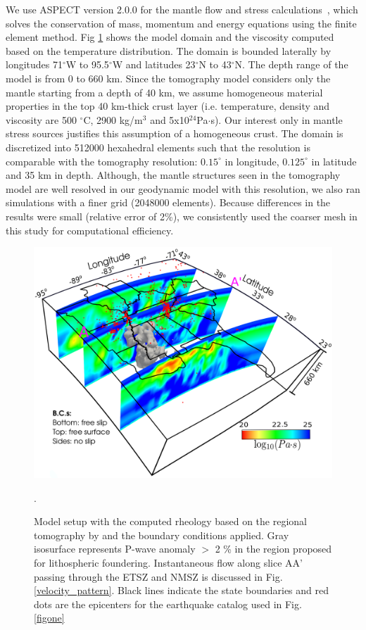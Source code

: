 \documentclass[draft,linenumbers]{agujournal2018}
\begin{document}
    We use ASPECT version 2.0.0 for the mantle flow and stress calculations~\citep{heister_aspect_methods2,KHB12,aspect-doi-v2.0.0}, which solves the conservation of mass, momentum and energy equations using the finite element method. Fig \ref{fig_model} shows the model domain and the viscosity computed based on the temperature distribution. The domain is bounded laterally by longitudes 71$^\circ$W to 95.5$^\circ$W and latitudes 23$^\circ$N to 43$^\circ$N. The depth range of the model is from 0 to 660 km. Since the tomography model considers only the mantle starting from a depth of 40 km, we assume homogeneous material properties in the top 40 km-thick crust layer (i.e. temperature, density and viscosity are 500 $^{\circ}$C, 2900 kg/m$^{3}$ and  5x10$^{24}$Pa$\cdot$s). Our interest only in mantle stress sources justifies this assumption of a homogeneous crust. The domain is discretized into 512000 hexahedral elements such that the resolution is comparable with the tomography resolution: $0.15^\circ$ in longitude, $0.125^\circ$ in latitude and 35 km in depth. Although, the mantle structures seen in the tomography model are well resolved in our geodynamic model with this resolution, we also ran simulations with a finer grid (2048000 elements). Because differences in the results were small (relative error of 2\%), we consistently used the coarser mesh in this study for computational efficiency.
%
\begin{figure}[ht]
    \centering
    \includegraphics[width=0.75\linewidth]{figures/model_figure.png}
    \caption{Model setup with the computed rheology based on the regional tomography by \citet{Biryol_2016} and the boundary conditions applied. Gray isosurface represents P-wave anomaly $>$ 2 \% in the region proposed for lithospheric foundering. Instantaneous flow along slice AA' passing through the ETSZ and NMSZ is discussed in Fig. \ref{velocity_pattern}. Black lines indicate the state boundaries and red dots are the epicenters for the earthquake catalog used in Fig. \ref{figone}}.
    \label{fig_model}
 \end{figure}
    
\end{document}
